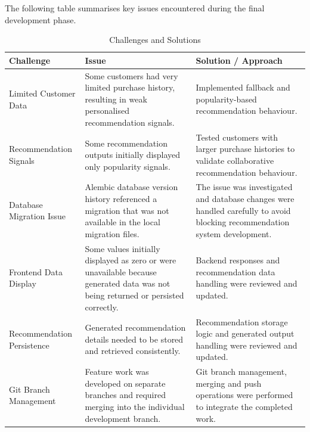 \documentclass[12pt,a4paper]{report}
\begin{document}
The following table summarises key issues encountered during the final
development phase.

\begin{table}[H]
\centering
\caption{Challenges and Solutions}
\begin{tabular}{p{4cm} p{4.5cm} p{4.5cm}}
\toprule

\textbf{Challenge} &
\textbf{Issue} &
\textbf{Solution / Approach} \\

\midrule

Limited Customer Data &
Some customers had very limited purchase history, resulting in weak
personalised recommendation signals. &
Implemented fallback and popularity-based recommendation behaviour. \\[6pt]

Recommendation Signals &
Some recommendation outputs initially displayed only popularity signals. &
Tested customers with larger purchase histories to validate
collaborative recommendation behaviour. \\[6pt]

Database Migration Issue &
Alembic database version history referenced a migration that was not
available in the local migration files. &
The issue was investigated and database changes were handled carefully
to avoid blocking recommendation system development. \\[6pt]

Frontend Data Display &
Some values initially displayed as zero or were unavailable because
generated data was not being returned or persisted correctly. &
Backend responses and recommendation data handling were reviewed and
updated. \\[6pt]

Recommendation Persistence &
Generated recommendation details needed to be stored and retrieved
consistently. &
Recommendation storage logic and generated output handling were
reviewed and updated. \\[6pt]

Git Branch Management &
Feature work was developed on separate branches and required merging
into the individual development branch. &
Git branch management, merging and push operations were performed to
integrate the completed work. \\

\bottomrule

\end{tabular}
\end{table}
\end{document}
